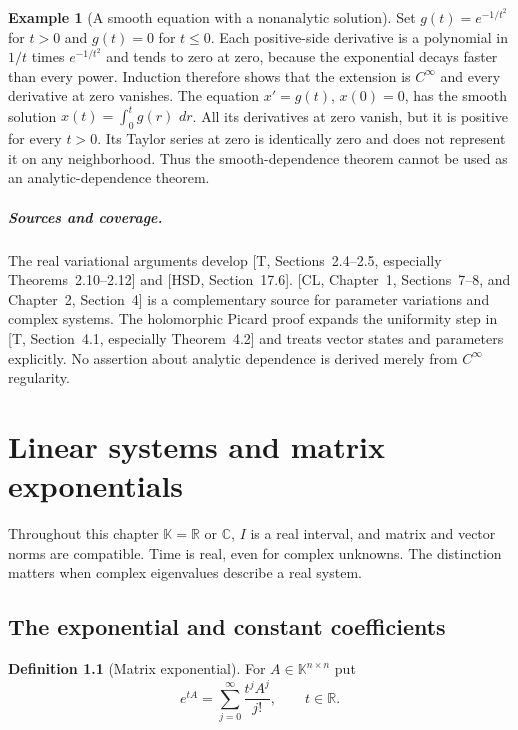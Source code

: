 \documentclass[11pt,oneside]{book}
\theoremstyle{definition}
\newtheorem{definition}[theorem]{Definition}
\newtheorem{example}[theorem]{Example}
\theoremstyle{remark}\newtheorem{remark}[theorem]{Remark}
\newcommand{\R}{\mathbb R}\newcommand{\C}{\mathbb C}
\newcommand{\dd}{\,d}\newcommand{\id}{\operatorname{id}}
\begin{document}
\begin{example}[A smooth equation with a nonanalytic solution]\label{d13:06:smooth-not-analytic}
Set $g(t)=e^{-1/t^2}$ for $t>0$ and $g(t)=0$ for $t\leq0$.
Each positive-side derivative is a polynomial in $1/t$ times
$e^{-1/t^2}$ and tends to zero at zero, because the exponential
decays faster than every power. Induction therefore shows that the
extension is $C^\infty$ and every derivative at zero vanishes.
The equation $x'=g(t)$, $x(0)=0$, has the smooth solution
$x(t)=\int_0^t g(r)\,\dd r$. All its derivatives at zero vanish,
but it is positive for every $t>0$. Its Taylor series at zero is
identically zero and does not represent it on any neighborhood.
Thus the smooth-dependence theorem cannot be used as an
analytic-dependence theorem.
\end{example}

\paragraph{Sources and coverage.}
The real variational arguments develop [T, Sections~2.4--2.5,
especially Theorems~2.10--2.12] and [HSD, Section~17.6].
[CL, Chapter~1, Sections~7--8, and Chapter~2, Section~4] is a
complementary source for parameter variations and complex systems.
The holomorphic Picard proof expands the uniformity step in [T,
Section~4.1, especially Theorem~4.2] and treats vector states and
parameters explicitly. No assertion about analytic dependence is
derived merely from $C^\infty$ regularity.



\chapter{Linear systems and matrix exponentials}\label{ch:d13-07}

Throughout this chapter \(\mathbb K=\R\) or \(\C\), \(I\) is a real interval,
and matrix and vector norms are compatible. Time is real, even for complex
unknowns. The distinction matters when complex eigenvalues describe a real
system.

\section{The exponential and constant coefficients}

\begin{definition}[Matrix exponential]\label{d13:07:exp-definition}
For \(A\in\mathbb K^{n\times n}\) put
\[
 e^{tA}=\sum_{j=0}^{\infty}\frac{t^j A^j}{j!},\qquad t\in\R .
\]
\end{definition}
\end{document}
